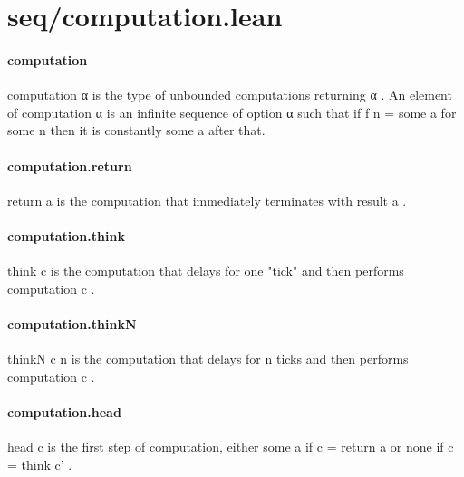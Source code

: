 \documentclass{article}
\begin{document}
\section{seq/computation.lean}\paragraph{computation}
\par
\colorbox[RGB]{253,246,227}{{{{\color[RGB]{101, 123, 131} computation α }}}} is the type of unbounded computations returning 
\colorbox[RGB]{253,246,227}{{{{\color[RGB]{101, 123, 131} α }}}}.
An element of 
\colorbox[RGB]{253,246,227}{{{{\color[RGB]{101, 123, 131} computation α }}}} is an infinite sequence of 
\colorbox[RGB]{253,246,227}{{{{\color[RGB]{101, 123, 131} option α }}}} such
that if 
\colorbox[RGB]{253,246,227}{{{{\color[RGB]{101, 123, 131} f n  }}}{{{\color[RGB]{181, 137, 0} = }}}{{{\color[RGB]{101, 123, 131}  some a }}}} for some 
\colorbox[RGB]{253,246,227}{{{{\color[RGB]{101, 123, 131} n }}}} then it is constantly 
\colorbox[RGB]{253,246,227}{{{{\color[RGB]{101, 123, 131} some a }}}} after that.
\paragraph{computation.return}
\par
\colorbox[RGB]{253,246,227}{{{{\color[RGB]{101, 123, 131} return a }}}} is the computation that immediately terminates with result 
\colorbox[RGB]{253,246,227}{{{{\color[RGB]{101, 123, 131} a }}}}.
\paragraph{computation.think}
\par
\colorbox[RGB]{253,246,227}{{{{\color[RGB]{101, 123, 131} think c }}}} is the computation that delays for one "tick" and then performs
computation 
\colorbox[RGB]{253,246,227}{{{{\color[RGB]{101, 123, 131} c }}}}.
\paragraph{computation.thinkN}
\par
\colorbox[RGB]{253,246,227}{{{{\color[RGB]{101, 123, 131} thinkN c n }}}} is the computation that delays for 
\colorbox[RGB]{253,246,227}{{{{\color[RGB]{101, 123, 131} n }}}} ticks and then performs
computation 
\colorbox[RGB]{253,246,227}{{{{\color[RGB]{101, 123, 131} c }}}}.
\paragraph{computation.head}
\par
\colorbox[RGB]{253,246,227}{{{{\color[RGB]{101, 123, 131} head c }}}} is the first step of computation, either 
\colorbox[RGB]{253,246,227}{{{{\color[RGB]{101, 123, 131} some a }}}} if 
\colorbox[RGB]{253,246,227}{{{{\color[RGB]{101, 123, 131} c  }}}{{{\color[RGB]{181, 137, 0} = }}}{{{\color[RGB]{101, 123, 131}  return a }}}}or 
\colorbox[RGB]{253,246,227}{{{{\color[RGB]{101, 123, 131} none }}}} if 
\colorbox[RGB]{253,246,227}{{{{\color[RGB]{101, 123, 131} c  }}}{{{\color[RGB]{181, 137, 0} = }}}{{{\color[RGB]{101, 123, 131}  think c' }}}}.
\end{document}
